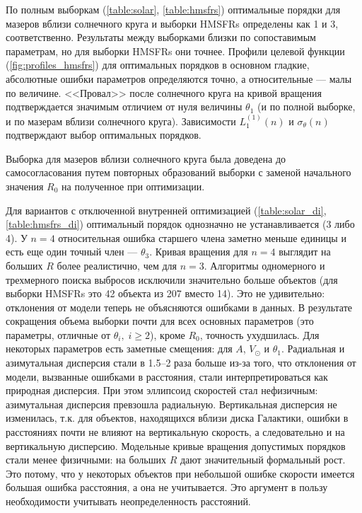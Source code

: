 \documentclass[a4paper, oneside, 14pt]{article}
\begin{document}
По полным выборкам (\autoref{table:solar}, \autoref{table:hmsfrs}) оптимальные порядки для мазеров вблизи солнечного круга и выборки HMSFRs определены как 1 и 3, соответственно. Результаты между выборками близки по сопоставимым параметрам, но для выборки HMSFRs они точнее. Профили целевой функции (\autoref{fig:profiles_hmsfrs}) для оптимальных порядков в основном гладкие, абсолютные ошибки параметров определяются точно, а относительные --- малы по величине. <<Провал>> после солнечного круга на кривой вращения подтверждается значимым отличием от нуля величины $ \theta_1 $ (и по полной выборке, и по мазерам вблизи солнечного круга). Зависимости $ L_1^{(1)}(n) $ и $ \sigma_\theta(n) $ подтверждают выбор оптимальных порядков.

Выборка для мазеров вблизи солнечного круга была доведена до самосогласования путем повторных образований выборки с заменой начального значения $ R_0 $ на полученное при оптимизации.

Для вариантов с отключенной внутренней оптимизацией (\autoref{table:solar_di}, \autoref{table:hmsfrs_di}) оптимальный порядок однозначно не устанавливается (3 либо 4). У $ n = 4 $ относительная ошибка старшего члена заметно меньше единицы и есть еще один точный член --- $ \theta_3 $. Кривая вращения для $ n = 4 $ выглядит на больших $ R $ более реалистично, чем для $ n = 3 $. Алгоритмы одномерного и трехмерного поиска выбросов исключили значительно больше объектов (для выборки HMSFRs это 42 объекта из 207 вместо 14). Это не удивительно: отклонения от модели теперь не объясняются ошибками в данных. В результате сокращения объема выборки почти для всех основных параметров (это параметры, отличные от $ \theta_i, \; i \ge 2 $), кроме $ R_0 $, точность ухудшилась. Для некоторых параметров есть заметные смещения: для $ A $, $ V_\odot $ и $ \theta_1 $. Радиальная и азимутальная дисперсия стали в 1.5--2 раза больше из-за того, что отклонения от модели, вызванные ошибками в расстояния, стали интерпретироваться как природная дисперсия. При этом эллипсоид скоростей стал нефизичным: азимутальная дисперсия превзошла радиальную. Вертикальная дисперсия не изменилась, т.к. для объектов, находящихся вблизи диска Галактики, ошибки в расстояниях почти не влияют на вертикальную скорость, а следовательно и на вертикальную дисперсию. Модельные кривые вращения допустимых порядков стали менее физичными: на больших $ R $ дают значительный формальный рост. Это потому, что у некоторых объектов при небольшой ошибке скорости имеется большая ошибка расстояния, а она не учитывается. Это аргумент в пользу необходимости учитывать неопределенность расстояний.
\end{document}
